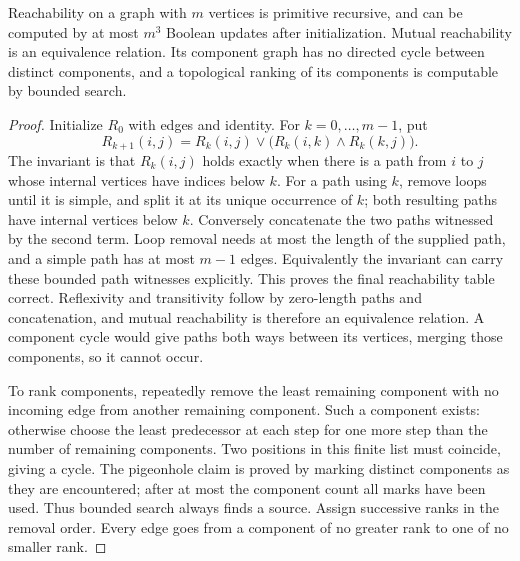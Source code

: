 \begin{lemma}\label{ca-reachability}
Reachability on a graph with $m$ vertices is primitive recursive, and can be
computed by at most $m^3$ Boolean updates after initialization.  Mutual
reachability is an equivalence relation.  Its component graph has no directed
cycle between distinct components, and a topological ranking of its
components is computable by bounded search.
\end{lemma}
\begin{proof}
Initialize $R_0$ with edges and identity.  For $k=0,\ldots,m-1$, put
\[
 R_{k+1}(i,j)=R_k(i,j)\vee\bigl(R_k(i,k)\wedge R_k(k,j)\bigr).
\]
The invariant is that $R_k(i,j)$ holds exactly when there is a path from
$i$ to $j$ whose internal vertices have indices below $k$.  For a path using
$k$, remove loops until it is simple, and split it at its unique occurrence
of $k$; both resulting paths have internal vertices below $k$.  Conversely
concatenate the two paths witnessed by the second term.  Loop removal needs
at most the length of the supplied path, and a simple path has at most
$m-1$ edges.  Equivalently the invariant can carry these bounded path
witnesses explicitly.  This proves the final reachability table correct.
Reflexivity and transitivity follow by zero-length paths and concatenation,
and mutual reachability is therefore an equivalence relation.  A component
cycle would give paths both ways between its vertices, merging those
components, so it cannot occur.

To rank components, repeatedly remove the least remaining component with no
incoming edge from another remaining component.  Such a component exists:
otherwise choose the least predecessor at each step for one more step than
the number of remaining components.  Two positions in this finite list must
coincide, giving a cycle.  The pigeonhole claim is proved by marking distinct
components as they are encountered; after at most the component count all
marks have been used.  Thus bounded search always finds a source.  Assign
successive ranks in the removal order.  Every edge goes from a component of
no greater rank to one of no smaller rank.
\end{proof}

